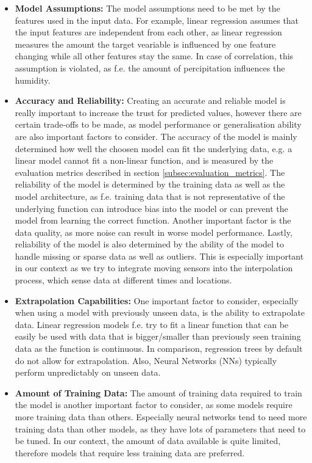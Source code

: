 \begin{itemize}
    \item \textbf{Model Assumptions:} The model assumptions need to be met by the features used in the input data. For example, linear regression assumes that the input features are independent from each other, as linear regression measures the amount the target veariable is influenced by one feature changing while all other features stay the same. In case of correlation, this assumption is violated, as f.e. the amount of percipitation influences the humidity.
    \item \textbf{Accuracy and Reliability:} Creating an accurate and reliable model is really important to increase the trust for predicted values, however there are certain trade-offs to be made, as model performance or generalisation ability are also important factors to consider.
    The accuracy of the model is mainly determined how well the choosen model can fit the underlying data, e.g. a linear model cannot fit a non-linear function, and is measured by the evaluation metrics described in section \ref{subsec:evaluation_metrics}.
    The reliability of the model is determined by the training data as well as the model architecture, as f.e. training data that is not representative of the underlying function can introduce bias into the model or can prevent the model from learning the correct function. Another important factor is the data quality, as more noise can result in worse model performance. Lastly, reliability of the model is also determined by the ability of the model to handle missing or sparse data as well as outliers. This is especially important in our context as we try to integrate moving sensors into the interpolation process, which sense data at different times and locations.
    \item \textbf{Extrapolation Capabilities:} One important factor to consider, especially when using a model with previously unseen data, is the ability to extrapolate data. Linear regression models f.e. try to fit a linear function that can be easily be used with data that is bigger/smaller than previously seen training data as the function is continuous. In comparison, regression trees by default do not allow for extrapolation. Also, Neural Networks (NNs) typically perform unpredictably on unseen data. 
    \item \textbf{Amount of Training Data:} The amount of training data required to train the model is another important factor to consider, as some models require more training data than others. Especially neural networks tend to need more training data than other models, as they have lots of parameters that need to be tuned. In our context, the amount of data available is quite limited, therefore models that require less training data are preferred.

\end{itemize}
